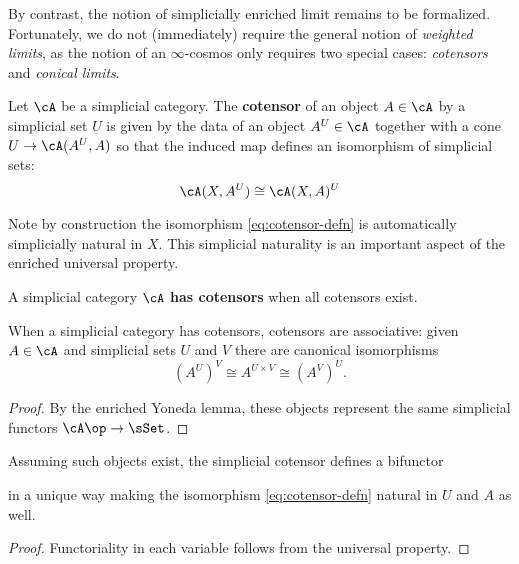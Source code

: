 By contrast, the notion of simplicially enriched limit remains to be formalized. Fortunately, we do not (immediately) require the general notion of \emph{weighted limits}, as the notion of an $\infty$-cosmos only requires two special cases: \emph{cotensors} and \emph{conical limits}.

\begin{definition}\label{defn:simplicial-cotensor}
\leanok
{}
  Let $\cA$ be a simplicial category. The \textbf{cotensor} of an object $A \in \cA$ by a simplicial set $U$ is given by the data of an object $A^U \in \cA$ together with a cone $U \to \cA(A^U,A)$ so that the induced map
  defines an isomorphism of simplicial sets:
  \begin{equation}\label{eq:cotensor-defn}
  \cA(X,A^U) \cong \cA(X,A)^U
  \end{equation}
\end{definition}

Note by construction the isomorphism \eqref{eq:cotensor-defn} is automatically simplicially natural in $X$. This simplicial naturality is an important aspect of the enriched universal property.

\begin{definition}\label{defn:simplicial-cotensors}
  \leanok
  A simplicial category $\cA$ \textbf{has cotensors} when all cotensors exist.
\end{definition}

\begin{lemma}\label{lem:cotensor-associativity}
   When a simplicial category has cotensors, cotensors are associative: given $A \in \cA$ and simplicial sets $U$ and $V$ there are canonical isomorphisms \[ (A^U)^V \cong A^{U \times V} \cong (A^V)^U.\]
\end{lemma}
\begin{proof}
By the enriched Yoneda lemma, these objects represent the same simplicial functors $\cA\op \to \sSet$.
\end{proof}


\begin{lemma}\label{lem:cotensor-bifunctor}
\leanok
{}
  Assuming such objects exist, the simplicial cotensor defines a bifunctor
  \begin{center}
  \end{center} in a unique way making the isomorphism \eqref{eq:cotensor-defn} natural in $U$ and $A$ as well.
\end{lemma}
\begin{proof}
  \leanok
  Functoriality in each variable follows from the universal property.
\end{proof}

